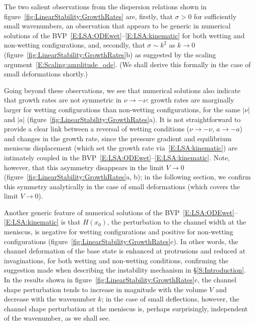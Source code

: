 \documentclass{jfm}
\newcommand{\blue}[1]{{\color{blue} #1}}
\newcommand{\aspect}{a} %
\begin{document}

The two salient observations from the dispersion relations shown in figure~\ref{fig:LinearStability:GrowthRates} are, firstly, that $\sigma > 0$ for sufficiently small wavenumbers, an observation that appears to be generic in numerical solutions of the BVP~\eqref{E:LSA:ODEwet}--\eqref{E:LSA:kinematic} for both wetting and non-wetting configurations, and, secondly, that $\sigma\sim k^2$ as $k \to 0$ (figure~\ref{fig:LinearStability:GrowthRates}b) as suggested by the scaling argument~\eqref{E:Scaling:amplitude_ode}. (We shall derive this formally in the case of small deformations shortly.)

Going beyond these observations, we see that numerical solutions also indicate that growth rates are not symmetric in $\nu \to -\nu$: growth rates are marginally larger for wetting configurations than non-wetting configurations, for the same $|\nu|$ and $|\aspect|$ (figure~\ref{fig:LinearStability:GrowthRates}a). It is not straightforward to provide a clear link between a reversal of wetting conditions ($\nu \to -\nu$, $a \to -a$) and changes in the growth rate, since the pressure gradient and equilibrium meniscus displacement (which set the growth rate via~\eqref{E:LSA:kinematic}) are intimately coupled in the BVP~\eqref{E:LSA:ODEwet}--\eqref{E:LSA:kinematic}. Note, however, that this asymmetry disappears in the limit $V \to 0$ (figure~\ref{fig:LinearStability:GrowthRates}a, b); in the following section, we confirm this symmetry analytically in the case of small deformations (which covers the limit $V \to 0$).  %

Another generic feature of numerical solutions of the BVP~\eqref{E:LSA:ODEwet}--\eqref{E:LSA:kinematic} is that $H(x_0)$, the perturbation to the channel width at the meniscus, is negative for wetting configurations and positive for non-wetting configurations (figure~\ref{fig:LinearStability:GrowthRates}c). In other words, the channel deformation of the base state is enhanced at protrusions and reduced at invaginations, for both wetting and non-wetting conditions, confirming the suggestion made when describing the instability mechanism in \S\ref{S:Introduction}. In the results shown in figure~\ref{fig:LinearStability:GrowthRates}c, the channel shape perturbation tends to increase in magnitude with the volume $V$ and decrease with the wavenumber $k$; in the case of small deflections, however, the channel shape perturbation at the meniscus is, perhaps surprisingly, independent of the wavenumber, as we shall see. 
\end{document}
